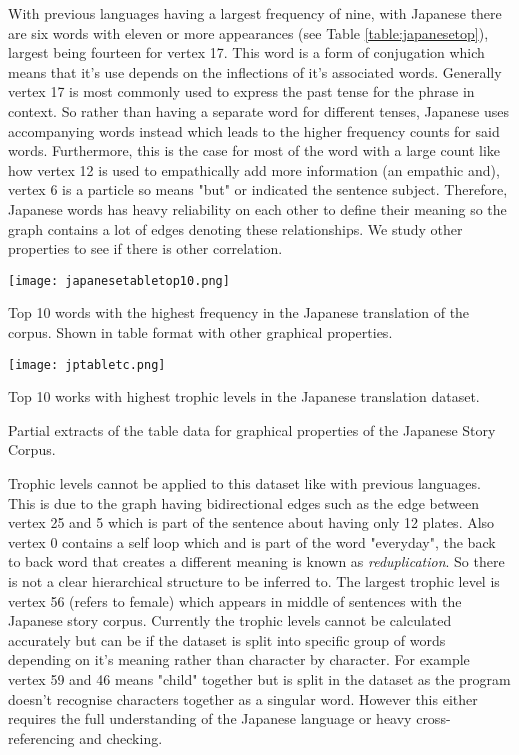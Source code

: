 With previous languages having a largest frequency of nine, with Japanese there are six words with eleven or more appearances (see Table \ref{table:japanesetop}), largest being fourteen for vertex 17. This word is a form of conjugation which means that it's use depends on the inflections of it's associated words. Generally vertex 17 is most commonly used to express the past tense for the phrase in context. So rather than having a separate word for different tenses, Japanese uses accompanying words instead which leads to the higher frequency counts for said words. Furthermore, this is the case for most of the word with a large count like how vertex 12 is used to empathically add more information (an empathic and), vertex 6 is a particle so means "but" or indicated the sentence subject. Therefore, Japanese words has heavy reliability on each other to define their meaning so the graph contains a lot of edges denoting these relationships. We study other properties to see if there is other correlation.

\begin{table}[H]
\centering
\begin{subtable}{.45\textwidth}
	\texttt{[image: japanesetabletop10.png]}
	\caption{Top 10 words with the highest frequency in the Japanese translation of the corpus. Shown in table format with other graphical properties. }
	\label{table:japanesetop}
\end{subtable}
\hfill
\begin{subtable}{.45\textwidth}
	\hspace{1.5cm} 
	\texttt{[image: jptabletc.png]}
	\caption{Top 10 works with highest trophic levels in the Japanese translation dataset.}
	\label{table:japanesentoptc}
\end{subtable}
\caption{Partial extracts of the table data for graphical properties of the Japanese Story Corpus.}
\end{table}

Trophic levels cannot be applied to this dataset like with previous languages. This is due to the graph having bidirectional edges such as the edge between vertex 25 and 5 which is part of the sentence about having only 12 plates. Also vertex 0 contains a self loop which and is part of the word "everyday", the back to back word that creates a different meaning is known as \emph{reduplication}. So there is not a clear hierarchical structure to be inferred to. The largest trophic level is vertex 56 (refers to female) which appears in middle of sentences with the Japanese story corpus. Currently the trophic levels cannot be calculated accurately but can be if the dataset is split into specific group of words depending on it's meaning rather than character by character. For example vertex 59 and 46 means "child" together but is split in the dataset as the program doesn't recognise characters together as a singular word. However this either requires the full understanding of the Japanese language or heavy cross-referencing and checking. 

